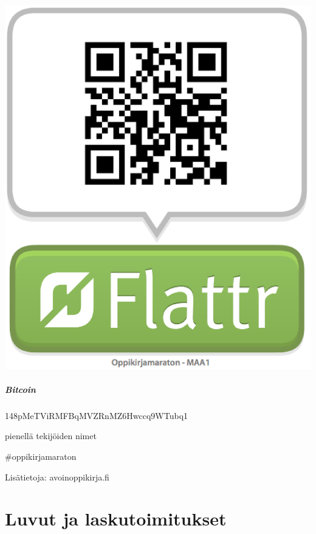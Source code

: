 \includegraphics[scale=0.2]{MAA1-Flattr.png}


\subsubsection*{Bitcoin}

148pMeTViRMFBqMVZRnMZ6Hwccq9WTubq1


pienellä tekijöiden nimet

\#oppikirjamaraton


Lisätietoja: avoinoppikirja.fi

\tableofcontents



\part{Luvut ja laskutoimitukset}
    
    
    
    
    
    
    
    
    
    

